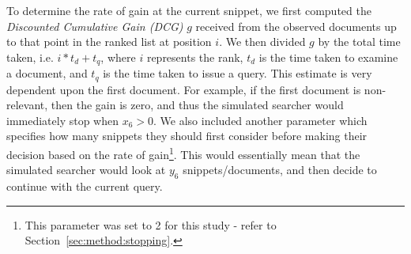 To determine the rate of gain at the current snippet, we first computed the \emph{Discounted Cumulative Gain (DCG)} $g$ received from the observed documents up to that point in the ranked list at position $i$. We then divided $g$ by the total time taken, i.e. $i*t_d +t_q$, where $i$ represents the rank, $t_d$ is the time taken to examine a document, and $t_q$ is the time taken to issue a query. This estimate is very dependent upon the first document. For example, if the first document is non-relevant, then the gain is zero, and thus the simulated searcher would immediately stop when $x_6>0$. We also included another parameter which specifies how many snippets they should first consider before making their decision based on the rate of gain\footnote{\scriptsize{This parameter was set to 2 for this study - refer to Section~\ref{sec:method:stopping}.}}. This would essentially mean that the simulated searcher would look at $y_6$ snippets/documents, and then decide to continue with the current query.

